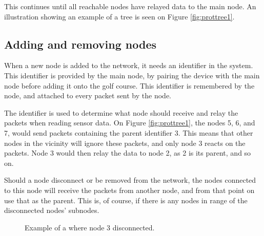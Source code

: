 This continues until all reachable nodes have relayed data to the main node.
An illustration showing an example of a tree is seen on Figure \ref{fig:prottree1}.

\subsection*{Adding and removing nodes}
When a new node is added to the network, it needs an identifier in the system. This identifier is provided by the main node, by pairing the device with the main node before adding it onto the golf course. 
This identifier is remembered by the node, and attached to every packet sent by the node.

The identifier is used to determine what node should receive and relay the packets when reading sensor data. On Figure \ref{fig:prottree1}, the nodes 5, 6, and 7, would send packets containing the parent identifier 3. This means that other nodes in the vicinity will ignore these packets, and only node 3 reacts on the packets. Node 3 would then relay the data to node 2, as 2 is its parent, and so on.

Should a node disconnect or be removed from the network, the nodes connected to this node will receive the packets from another node, and from that point on use that as the parent. This is, of course, if there is any nodes in range of the disconnected nodes' subnodes. 

\begin{figure}[!h]
	\centering
	\caption{Example of a where node 3 disconnected.}
	\label{fig:prottree2}
\end{figure}

